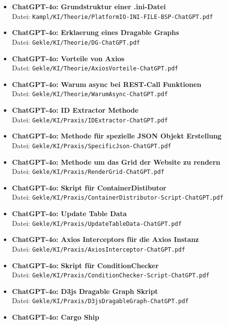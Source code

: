 \documentclass[
    headings=optiontotocandhead,%
    twoside,
    numbers=noenddot,%
    12pt, %
    titlepage, %
    parskip=full, %
    listof=leveldown, 
    numbers=noenddot, %
    a4paper,DIV=14,
    BCOR=15mm,
]{scrbook}
\begin{document}
\begin{itemize}

\item \textbf{ChatGPT-4o: Grundstruktur einer
.ini-Datei}\\  Datei: \texttt{Kampl/KI/Theorie/PlatformIO-INI-FILE-BSP-ChatGPT.pdf}
\item \textbf{ChatGPT-4o: Erklaerung eines Dragable
Graphs}\\  Datei: \texttt{Gekle/KI/Theorie/DG-ChatGPT.pdf}
\item \textbf{ChatGPT-4o: Vorteile von
Axios}\\  Datei: \texttt{Gekle/KI/Theorie/AxiosVorteile-ChatGPT.pdf}
\item \textbf{ChatGPT-4o: Warum async bei REST-Call
Funktionen}\\  Datei: \texttt{Gekle/KI/Theorie/WarumAsync-ChatGPT.pdf}
\item \textbf{ChatGPT-4o: ID Extractor
Methode}\\  Datei: \texttt{Gekle/KI/Praxis/IDExtractor-ChatGPT.pdf}
\item \textbf{ChatGPT-4o: Methode für spezielle JSON Objekt
Erstellung}\\  Datei: \texttt{Gekle/KI/Praxis/SpecificJson-ChatGPT.pdf}
\item \textbf{ChatGPT-4o: Methode um das Grid der Website zu
rendern}\\  Datei: \texttt{Gekle/KI/Praxis/RenderGrid-ChatGPT.pdf}
\item \textbf{ChatGPT-4o: Skript für
ContainerDistibutor}\\  Datei: \texttt{Gekle/KI/Praxis/ContainerDistributor-Script-ChatGPT.pdf}
\item \textbf{ChatGPT-4o: Update Table
Data}\\  Datei: \texttt{Gekle/KI/Praxis/UpdateTableData-ChatGPT.pdf}
\item \textbf{ChatGPT-4o: Axios Interceptors für die Axios
Instanz}\\  Datei: \texttt{Gekle/KI/Praxis/AxiosInterceptor-ChatGPT.pdf}
\item \textbf{ChatGPT-4o: Skript für
ConditionChecker}\\  Datei: \texttt{Gekle/KI/Praxis/ConditionChecker-Script-ChatGPT.pdf}
\item \textbf{ChatGPT-4o: D3js Dragable Graph
Skript}\\  Datei: \texttt{Gekle/KI/Praxis/D3jsDragableGraph-ChatGPT.pdf}
\item \textbf{ChatGPT-4o: Cargo Ship
}
\end{itemize}
\end{document}
